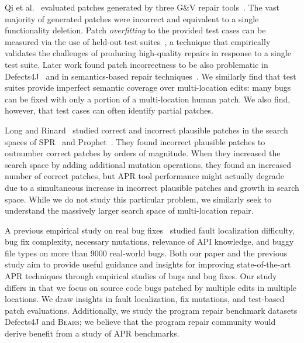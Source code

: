\documentclass[10pt, conference]{IEEEtran}
\newcommand\bears{\textsc{Bears}\xspace}
\begin{document}
Qi et al.~\cite{patch-correctness} evaluated patches generated 
by three G\&V repair tools~\cite{genprog, ae, rsrepair}. 
The vast majority of generated patches were incorrect and equivalent to 
a single functionality deletion.  Patch \emph{overfitting} to the provided test
cases can be measured via the use of held-out test
suites~\cite{Smith15fse}, a technique that empirically validates the challenges of producing
high-quality repairs in response to a single test suite.   Later work found patch incorrectness to be 
also problematic in Defects4J~\cite{d4j-eval} and in semantics-based 
repair techniques~\cite{Le2018}.  We similarly find that test suites provide
imperfect semantic coverage over multi-location edits: many bugs can be fixed
with only a portion of a multi-location human patch.  We 
also find, however, that test cases can often identify partial patches. 

Long and Rinard~\cite{long-search-spaces} studied
correct and incorrect plausible patches in the search spaces of SPR~\cite{spr} 
and Prophet~\cite{prophet}. They found incorrect plausible patches to outnumber 
correct patches by orders of magnitude. When they increased the search space 
by adding additional mutation operations, they found an increased number of 
correct patches, but APR tool performance might actually degrade due to a 
simultaneous increase in incorrect plausible patches and growth in search space.  
While we do not study this particular problem, 
we similarly seek to understand the 
massively larger search space of multi-location repair. 

A previous empirical study on real bug fixes~\cite{zhong2015} 
studied fault localization difficulty, bug fix complexity, necessary
mutations, relevance of API knowledge, and buggy file types
on more than 9000 real-world bugs.  
Both our paper and the previous study aim to provide useful guidance and insights for 
improving state-of-the-art APR techniques through empirical studies of bugs and bug fixes. 
Our study differs in that we focus on 
source code bugs patched by multiple edits in multiple locations. 
We draw insights in fault localization, fix mutations, and test-based 
patch evaluations. Additionally, we study the program repair 
benchmark datasets Defects4J 
and \bears; we believe that the program repair community would derive 
benefit from a study of APR benchmarks.
\end{document}
